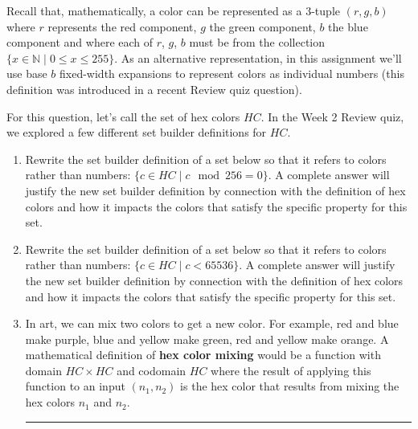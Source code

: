 \begin{enumerate}[labelindent=0pt, leftmargin=0pt]
Recall that, mathematically, a color can be represented as a $3$-tuple $(r, g, b)$ 
where $r$ represents the red component, $g$ the green component, $b$ the blue component and where each of $r$, $g$, $b$ must be from the collection $\{x \in \mathbb{N}\mid 0 \leq x \leq 255 \}$.
As an alternative representation, in this assignment
we'll use base $b$ fixed-width expansions to represent colors
as individual numbers (this definition was introduced in a recent Review quiz question).



For this question, let's call the set of hex colors $HC$. In the Week 2 Review quiz, 
we explored a few different set builder definitions for $HC$.

\begin{enumerate}
\item Rewrite the set builder definition of a set below so that it 
refers to colors rather than numbers: $\{ c \in HC \mid c \mod 256 = 0\}$. A complete answer will 
justify the new set builder definition by connection with the definition of hex colors and how it impacts
the colors that satisfy the specific property for this set.
\item Rewrite the set builder definition of a set below so that it 
refers to colors rather than numbers: $\{ c \in HC \mid c < 65536\}$. A complete answer will 
justify the new set builder definition by connection with the definition of hex colors and how it impacts
the colors that satisfy the specific property for this set.
\item  In art, we can mix two colors to get a new color. For example, red and blue make 
purple, blue and yellow make green, red and yellow make orange. 
A mathematical definition of {\bf hex color mixing} would be a function with domain $HC \times HC$
and codomain $HC$ where the result of applying this function to an input $(n_1, n_2)$ is the hex color
that results from mixing the hex colors $n_1$ and $n_2$.


\rule{0.5\textwidth}{.4pt}


\end{enumerate}
\end{enumerate}
